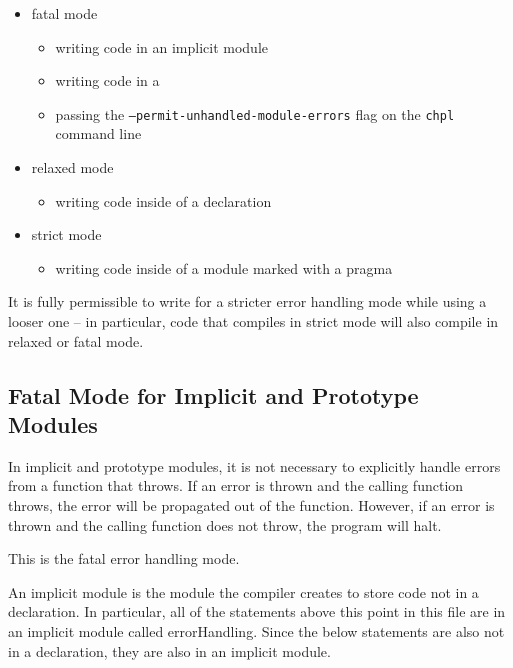 \begin{itemize}

\item fatal mode

\begin{itemize}
\item writing code in an implicit module
\item writing code in a 
\item passing the \texttt{--permit-unhandled-module-errors} flag on the
  \texttt{chpl} command line
\end{itemize}

\item relaxed mode

\begin{itemize}
\item writing code inside of a  declaration
\end{itemize}

\item strict mode
\begin{itemize}
\item writing code inside of a module marked with a pragma
\end{itemize}

\end{itemize}

It is fully permissible to write for a stricter error handling mode
while using a looser one -- in particular, code that compiles in strict
mode will also compile in relaxed or fatal mode.

\subsection{Fatal Mode for Implicit and Prototype Modules}
\label{Errors_Fatal_Mode}

In implicit and prototype modules, it is not necessary to explicitly handle
errors from a function that throws. If an error is thrown and the calling
function throws, the error will be propagated out of the function.  However,
if an error is thrown and the calling function does not throw, the program
will halt.

This is the fatal error handling mode.

An implicit module is the module the compiler creates to store
code not in a  declaration. In particular, all of the
statements above this point in this file are in an implicit module called
errorHandling. Since the below statements are also not in a 
declaration, they are also in an implicit module.


